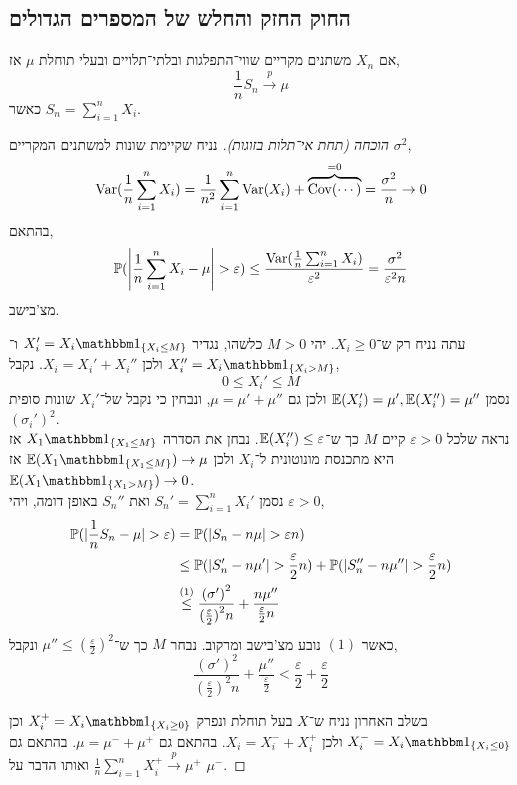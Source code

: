 \subsection{החוק החזק והחלש של המספרים הגדולים}
\begin{theorem}
	אם $X_n$ משתנים מקריים שווי־התפלגות ובלתי־תלויים ובעלי תוחלת $\mu$ אז,
	\[
		\frac{1}{n} S_n
		\xrightarrow{p} \mu
	\]
	כאשר $S_n = \sum_{i = 1}^n X_i$.
\end{theorem}
\begin{proof}[הוכחה (תחת אי־תלות בזוגות)]
	נניח שקיימת שונות למשתנים המקריים $\sigma^2$,
	\[
		\operatorname{Var}(\frac{1}{n} \sum_{i = 1}^n X_i)
		= \frac{1}{n^2} \sum_{i = 1}^n \operatorname{Var}(X_i) + \overbrace{\operatorname{Cov}(\cdots)}^{= 0}
		= \frac{\sigma^2}{n}
		\to 0
	\]
	בהתאם,
	\[
		\mathbb{P}(\left\lvert \frac{1}{n} \sum_{i = 1}^n X_i - \mu \right\rvert > \varepsilon)
		\le \frac{\operatorname{Var}(\frac{1}{n} \sum_{i = 1}^n X_i)}{\varepsilon^2}
		= \frac{\sigma^2}{\varepsilon^2 n}
	\]
	מצ'בישב.

	עתה נניח רק ש־$X_i \ge 0$.
	יהי $M > 0$ כלשהו, נגדיר $X_i' = X_i \indicator_{\{ X_i \le M \}}$ ו־$X_i'' = X_i \indicator_{\{ X_i > M \}}$ ולכן $X_i = X_i' + X_i''$.
	נקבל,
	\[
		0 \le X_i' \le M
	\]
	נסמן $\mathbb{E}(X_i') = \mu', \mathbb{E}(X_i'') = \mu''$ ולכן גם $\mu = \mu' + \mu''$, ונבחין כי נקבל של־$X_i'$ שונות סופית ${(\sigma_i')}^2$. \\
	נראה שלכל $\varepsilon > 0$ קיים $M$ כך ש־$\mathbb{E}(X_i'') \le \varepsilon$.
	נבחן את הסדרה $X_1 \indicator_{\{ X_1 \le M \}}$ אז היא מתכנסת מונוטונית ל־$X_i$ ולכן $\EE(X_1 \indicator_{\{ X_1 \le M \}}) \to \mu$ אז $\EE(X_1 \indicator_{\{ X_1 > M\}}) \to 0$. \\
	נסמן $S_n' = \sum_{i = 1}^n X_i'$ ואת $S_n''$ באופן דומה, ויהי $\varepsilon > 0$,
	\begin{align*}
		\mathbb{P}(|\frac{1}{n} S_n - \mu| > \varepsilon)
		& = \mathbb{P}(|S_n - n \mu| > \varepsilon n) \\
		& \le \mathbb{P}(|S_n' - n \mu'| > \frac{\varepsilon}{2} n) + \mathbb{P}(|S_n'' - n \mu''| > \frac{\varepsilon}{2} n) \\
		& \overset{(1)}{\le} \frac{{(\sigma')}^2}{{(\frac{\varepsilon}{2})}^2 n} + \frac{n \mu''}{\frac{\varepsilon}{2} n}
	\end{align*}
	כאשר $(1)$ נובע מצ'בישב ומרקוב.
	נבחר $M$ כך ש־$\mu'' \le {(\frac{\varepsilon}{2})}^2$
	ונקבל,
	\[
		\frac{{(\sigma')}^2}{{(\frac{\varepsilon}{2})}^2 n} + \frac{\mu''}{\frac{\varepsilon}{2}}
		< \frac{\varepsilon}{2} + \frac{\varepsilon}{2}
	\]

	בשלב האחרון נניח ש־$X$ בעל תוחלת ונפרק $X_i^+ = X_i \indicator_{\{ X_i \ge 0 \}}$ וכן $X_i^- = X_i \indicator_{\{ X_i \le 0 \}}$ ולכן $X_i = X_i^- + X_i^+$.
	בהתאם גם $\mu = \mu^- + \mu^+$.
	בהתאם גם $\frac{1}{n} \sum_{i = 1}^n X_i^+ \xrightarrow{p} \mu^+$ ואותו הדבר על $\mu^-$.
\end{proof}
